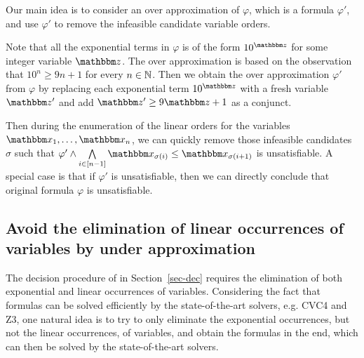 Our main idea is to consider an over approximation of $\varphi$, which is a {\pa} formula $\varphi'$, and use $\varphi'$ to remove the infeasible candidate variable orders.

Note that all the exponential terms in $\varphi$ is of the form $10^{\ivarz}$ for some integer variable $\ivarz$. 
%
The over approximation is based on the observation that $10^n \ge 9 n + 1$ for every $n \in \mathbb{N}$. Then we obtain the over approximation $\varphi'$ from $\varphi$ by replacing each exponential term $10^{\ivarz}$ with a fresh variable $\ivarz'$ and add $\ivarz' \ge 9 \ivarz +1$ as a conjunct.

Then during the enumeration of the linear orders for the variables $\ivarx_1, \ldots, \ivarx_n$, we can quickly remove those infeasible candidates $\sigma$ such that $\varphi' \wedge \bigwedge \limits_{i \in [n-1]}\ivarx_{\sigma(i)} \le \ivarx_{\sigma(i+1)}$ is unsatisfiable. A special case is that if $\varphi'$ is unsatisfiable, then we can directly conclude that original formula $\varphi$ is unsatisfiable.



\vspace*{-3mm}
\subsection{Avoid the elimination of linear occurrences of variables by under approximation}\label{para: opt under appro}

The decision procedure of {\paexp} in Section~\ref{sec-dec} requires the elimination of both exponential and linear occurrences of variables. Considering the fact that {\pa} formulas can be solved efficiently by the state-of-the-art solvers, e.g. CVC4 and Z3, one natural idea is to try to only eliminate the exponential occurrences, but not the linear occurrences, of variables, and obtain the {\pa} formulas in the end, which can then be solved by the state-of-the-art solvers.

